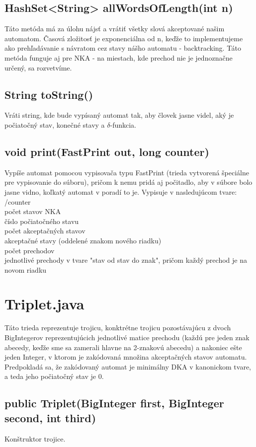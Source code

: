 \subsection*{HashSet<String> allWordsOfLength(int n)}
Táto metóda má za úlohu nájsť a vrátiť všetky slová akceptované našim automatom. Časová zložitosť je exponenciálna od n, keďže to implementujeme ako prehľadávanie s návratom cez stavy nášho automatu - backtracking. Táto metóda funguje aj pre NKA - na miestach, kde prechod nie je jednoznačne určený, sa rozvetvíme.

\subsection*{String toString()}
Vráti string, kde bude vypísaný automat tak, aby človek jasne videl, aký je počiatočný stav, konečné stavy a $\delta$-funkcia.

\subsection*{void print(FastPrint out, long counter)}
Vypíše automat pomocou vypisovača typu FastPrint (trieda vytvorená špeciálne pre vypisovanie do súboru), pričom k nemu pridá aj počitadlo, aby v súbore bolo jasne vidno, koľkatý automat v poradí to je. Vypisuje v nasledujúcom tvare: 
\\
/counter
\\
počet stavov NKA
\\
číslo počiatočného stavu
\\
počet akceptačných stavov
\\ akceptačné stavy (oddelené znakom nového riadku)
\\ počet prechodov
\\ jednotlivé prechody v tvare "stav od stav do znak", pričom každý prechod je na novom riadku

\section{Triplet.java}
Táto trieda reprezentuje trojicu, konktrétne trojicu pozostávajúcu z dvoch BigIntegerov reprezentujúcich jednotlivé matice prechodu (každú pre jeden znak abecedy, keďže sme sa zamerali hlavne na 2-znakovú abecedu) a nakoniec ešte jeden Integer, v ktorom je zakódovaná množina akceptačných stavov automatu. Predpokladá sa, že zakódovaný automat je minimálny DKA v kanonickom tvare, a teda jeho počiatočný stav je 0. 

\subsection{public Triplet(BigInteger first, BigInteger second, int third)}
Konštruktor trojice.

